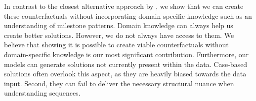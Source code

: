 \documentclass[./../../paper.tex]{subfiles}
\begin{document}
In contrast to the closest alternative approach by \citeauthor{hsieh_DiCE4ELInterpretingProcess_2021}, we show that we can create these counterfactuals without incorporating domain-specific knowledge such as an understanding of milestone patterns. Domain knowledge can always help us create better solutions. However, we do not always have access to them. We believe that showing it is possible to create viable counterfactuals without domain-specific knowledge is our most significant contribution. Furthermore, our models can generate solutions not currently present within the data. Case-based solutions often overlook this aspect, as they are heavily biased towards the data input. Second, they can fail to deliver the necessary structural nuance when understanding sequences.
\end{document}
